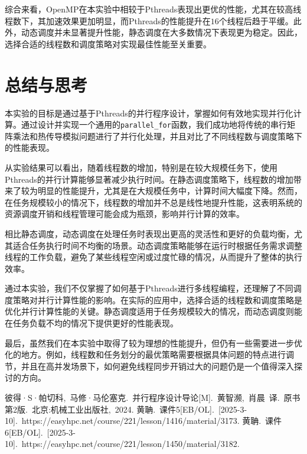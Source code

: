 \documentclass[a4paper, utf8]{ctexart}
\begin{document}
	综合来看，OpenMP在本实验中相较于Pthreads表现出更优的性能，尤其在较高线程数下，其加速效果更加明显，而Pthreads的性能提升在$16$个线程后趋于平缓。此外，动态调度并未显著提升性能，静态调度在大多数情况下表现更为稳定。因此，选择合适的线程数和调度策略对实现最佳性能至关重要。
	
	\section{总结与思考}
	
	本实验的目标是通过基于Pthreads的并行程序设计，掌握如何有效地实现并行化计算。通过设计并实现一个通用的\verb|parallel_for|函数，我们成功地将传统的串行矩阵乘法和热传导模拟问题进行了并行化处理，并且对比了不同线程数与调度策略下的性能表现。
	
	从实验结果可以看出，随着线程数的增加，特别是在较大规模任务下，使用Pthreads的并行计算能够显著减少执行时间。在静态调度策略下，线程数的增加带来了较为明显的性能提升，尤其是在大规模任务中，计算时间大幅度下降。然而，在任务规模较小的情况下，线程数的增加并不总是线性地提升性能，这表明系统的资源调度开销和线程管理可能会成为瓶颈，影响并行计算的效率。
	
	相比静态调度，动态调度在处理任务时表现出更高的灵活性和更好的负载均衡，尤其适合任务执行时间不均衡的场景。动态调度策略能够在运行时根据任务需求调整线程的工作负载，避免了某些线程空闲或过度忙碌的情况，从而提升了整体的执行效率。
	
	通过本实验，我们不仅掌握了如何基于Pthreads进行多线程编程，还理解了不同调度策略对并行计算性能的影响。在实际的应用中，选择合适的线程数和调度策略是优化并行计算性能的关键。静态调度适用于任务规模较大的情况，而动态调度则能在任务负载不均的情况下提供更好的性能表现。
	
	最后，虽然我们在本实验中取得了较为理想的性能提升，但仍有一些需要进一步优化的地方。例如，线程数和任务划分的最优策略需要根据具体问题的特点进行调节，并且在高并发场景下，如何避免线程同步开销过大的问题仍是一个值得深入探讨的方向。
	
	\let\cleardoublepage\clearpage
	
	\begin{thebibliography}{99}  
		 彼得·S·帕切科,\ 马修·马伦塞克.\ 并行程序设计导论[M].\ 黄智濒,\ 肖晨\ 译.\ 原书第2版.\ 北京:机械工业出版社,\ 2024.
		 黄聃.\ 课件5[EB/OL].\ [2025-3-10].\ https://easyhpc.net/course/221/lesson/1416/material/3173.
		 黄聃.\ 课件6[EB/OL].\ [2025-3-10].\ https://easyhpc.net/course/221/lesson/1450/material/3182.
	\end{thebibliography}
	
\end{document}
